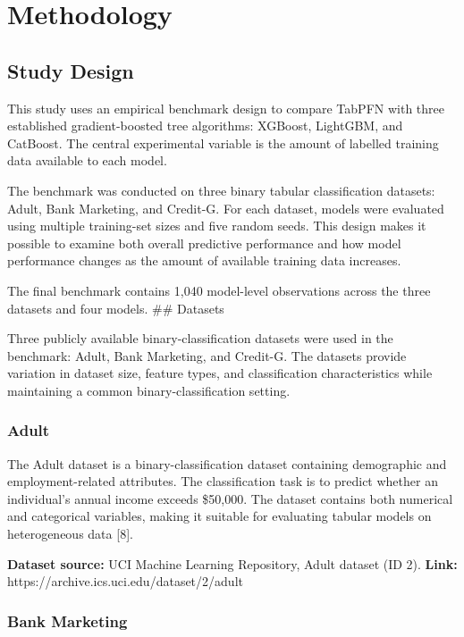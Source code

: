 \section{Methodology}\label{methodology}

\subsection{Study Design}\label{study-design}

This study uses an empirical benchmark design to compare TabPFN with three established gradient-boosted tree algorithms: XGBoost, LightGBM, and CatBoost. The central experimental variable is the amount of labelled training data available to each model.

The benchmark was conducted on three binary tabular classification datasets: Adult, Bank Marketing, and Credit-G. For each dataset, models were evaluated using multiple training-set sizes and five random seeds. This design makes it possible to examine both overall predictive performance and how model performance changes as the amount of available training data increases.

The final benchmark contains 1,040 model-level observations across the three datasets and four models. \#\# Datasets

Three publicly available binary-classification datasets were used in the benchmark: Adult, Bank Marketing, and Credit-G. The datasets provide variation in dataset size, feature types, and classification characteristics while maintaining a common binary-classification setting.

\subsubsection{Adult}\label{adult}

The Adult dataset is a binary-classification dataset containing demographic and employment-related attributes. The classification task is to predict whether an individual's annual income exceeds \$50,000. The dataset contains both numerical and categorical variables, making it suitable for evaluating tabular models on heterogeneous data {[}8{]}.

\textbf{Dataset source:} UCI Machine Learning Repository, Adult dataset (ID 2). \textbf{Link:} https://archive.ics.uci.edu/dataset/2/adult

\subsubsection{Bank Marketing}\label{bank-marketing}

